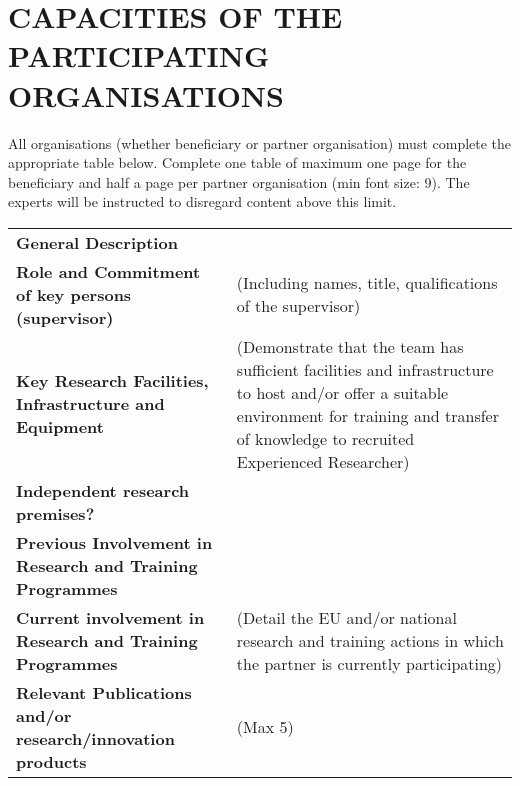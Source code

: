 \documentclass[a4paper,11pt]{article}
\begin{document}
\newpage
\section{CAPACITIES OF THE PARTICIPATING ORGANISATIONS}
\label{sec:capacities}

All organisations (whether beneficiary or partner organisation) must complete the appropriate table below. Complete one table of maximum one page for the beneficiary and half a page per partner organisation (min font size: 9). The experts will be instructed to disregard content above this limit.
\vspace{\baselineskip}

{\fontsize{9bp}{1em}\selectfont %
\noindent\begin{tabular}{>{\raggedright}p{}p{}}
  \multicolumn{2}{l}{\textbf{Beneficiary X}} \\\midrule
\textbf{General Description} &

\\\midrule
\textbf{Role and Commitment of key persons (supervisor)} &
(Including names, title, qualifications of the supervisor)
\\\midrule
\textbf{Key Research Facilities, Infrastructure and Equipment} &
(Demonstrate that the team has sufficient facilities and infrastructure to host and/or offer a suitable environment for training and transfer of knowledge to recruited Experienced Researcher)
\\\midrule
\textbf{Independent research premises?} &

\\\midrule
\textbf{Previous Involvement in Research and Training Programmes} &

\\\midrule
\textbf{Current involvement in Research and Training Programmes} &
(Detail the EU and/or national research and training actions in which the partner is currently participating)
\\\midrule
\textbf{Relevant Publications and/or research/innovation products} &
(Max 5)
\\\bottomrule
\end{tabular}}
\vspace{\baselineskip}
\end{document}
